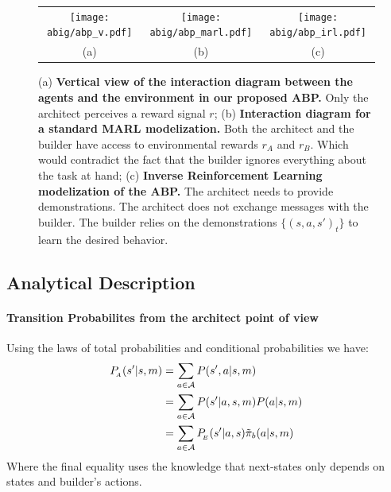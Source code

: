 \begin{figure}[h!]
    \centering
    \begin{tabular}{cccc}
    \texttt{[image: abig/abp\_v.pdf]} & \texttt{[image: abig/abp\_marl.pdf]} &  \multicolumn{2}{c}{\texttt{[image: abig/abp\_irl.pdf]}}\\
    \small (a) & \small(b) & \multicolumn{2}{c}{\small(c)}
    \end{tabular}
    \caption{\small (a) \textbf{Vertical view of the interaction diagram between the agents and the environment in our proposed ABP. } Only the architect perceives a reward signal $r$; (b) \textbf{Interaction diagram for a standard MARL modelization. } Both the architect and the builder have access to environmental rewards $r_A$ and $r_B$. Which would contradict the fact that the builder ignores everything about the task at hand; (c) \textbf{Inverse Reinforcement Learning modelization of the ABP. } The architect needs to provide demonstrations. The architect does not exchange messages with the builder. The builder relies on the demonstrations $\{(s,a,s')_t\}$ to learn the desired behavior.}
    \label{fig:sup_mdp_diag}
\end{figure}

\subsection{Analytical Description}
\label{ap:method_analytic}
\paragraph{Transition Probabilites from the architect point of view}
Using the laws of total probabilities and conditional probabilities we have: 
\begin{equation}
    \begin{split}
        P_{\!_A}(s'|s,m) &= \sum_{a\in{\mathcal{A}}} P(s',a | s,m)\\ 
        &= \sum_{a\in{\mathcal{A}}} P(s'|a,s,m) P(a|s,m)\\
        &= \sum_{a\in{\mathcal{A}}} P_{\!_E}(s'|a,s) \tilde{\pi}_b(a|s,m)
    \end{split}
\end{equation}
Where the final equality uses the knowledge that next-states only depends on states and builder's actions. 

